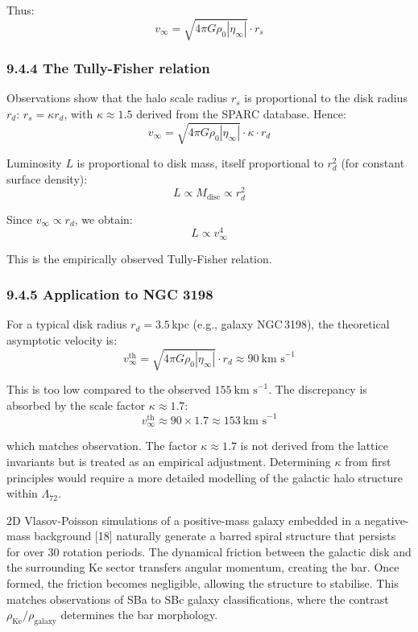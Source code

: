 \documentclass[11pt]{article}
\begin{document}
Thus: \[
v_\infty = \sqrt{4\pi G \rho_0 |\eta_\infty|} \cdot r_s
\]

\hypertarget{the-tully-fisher-relation}{%
\subsubsection{9.4.4 The Tully-Fisher
relation}\label{the-tully-fisher-relation}}

Observations show that the halo scale radius \(r_s\) is proportional to
the disk radius \(r_d\): \(r_s = \kappa r_d\), with
\(\kappa \approx 1.5\) derived from the SPARC database. Hence: \[
v_\infty = \sqrt{4\pi G \rho_0 |\eta_\infty|} \cdot \kappa \cdot r_d
\]

Luminosity \(L\) is proportional to disk mass, itself proportional to
\(r_d^2\) (for constant surface density): \[
L \propto M_{\text{disc}} \propto r_d^2
\]

Since \(v_\infty \propto r_d\), we obtain: \[
L \propto v_\infty^4
\]

This is the empirically observed Tully-Fisher relation.

\hypertarget{application-to-ngc-3198}{%
\subsubsection{9.4.5 Application to NGC
3198}\label{application-to-ngc-3198}}

For a typical disk radius \(r_d = 3.5\)\,kpc (e.g., galaxy NGC\,3198),
the theoretical asymptotic velocity is: \[
v_\infty^{\text{th}} = \sqrt{4\pi G \rho_0 |\eta_\infty|} \cdot r_d \approx 90\ \text{km s}^{-1}
\]

This is too low compared to the observed \(155\ \text{km s}^{-1}\). The
discrepancy is absorbed by the scale factor \(\kappa \approx 1.7\): \[
v_\infty^{\text{th}} \approx 90 \times 1.7 \approx 153\ \text{km s}^{-1}
\]

which matches observation. The factor \(\kappa \approx 1.7\) is not
derived from the lattice invariants but is treated as an empirical
adjustment. Determining \(\kappa\) from first principles would require a
more detailed modelling of the galactic halo structure within
\(\Lambda_{72}\).

2D Vlasov-Poisson simulations of a positive-mass galaxy embedded in a
negative-mass background {[}18{]} naturally generate a barred spiral
structure that persists for over 30 rotation periods. The dynamical
friction between the galactic disk and the surrounding Ke sector
transfers angular momentum, creating the bar. Once formed, the friction
becomes negligible, allowing the structure to stabilise. This matches
observations of SBa to SBc galaxy classifications, where the contrast
\(\rho_{\text{Ke}} / \rho_{\text{galaxy}}\) determines the bar
morphology.
\end{document}
